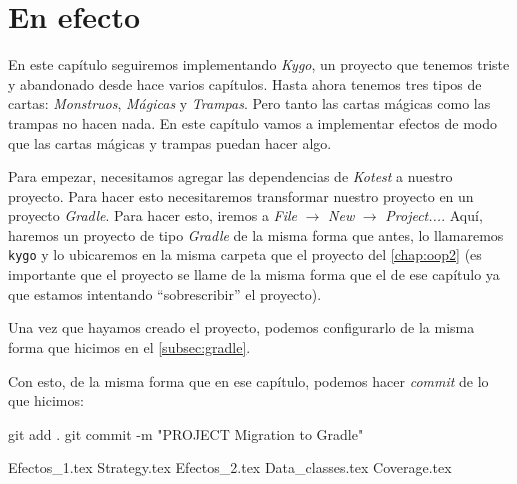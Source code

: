\chapter{En efecto}
\label{sec:strategy}
  
  En este capítulo seguiremos implementando \textit{Kygo}, un proyecto que tenemos triste y
  abandonado desde hace varios capítulos.
  Hasta ahora tenemos tres tipos de cartas: \textit{Monstruos}, \textit{Mágicas} y \textit{Trampas}.
  Pero tanto las cartas mágicas como las trampas no hacen nada.
  En este capítulo vamos a implementar efectos de modo que las cartas mágicas y trampas puedan
  hacer algo.

  Para empezar, necesitamos agregar las dependencias de \textit{Kotest} a nuestro proyecto.
  Para hacer esto necesitaremos transformar nuestro proyecto en un proyecto \textit{Gradle}.
  Para hacer esto, iremos a \textit{File} $\rightarrow$ \textit{New} $\rightarrow$ 
  \textit{Project...}.
  Aquí, haremos un proyecto de tipo \textit{Gradle} de la misma forma que antes, lo llamaremos
  \texttt{kygo} y lo ubicaremos en la misma carpeta que el proyecto del \cref{chap:oop2} (es 
  importante que el proyecto se llame de la misma forma que el de ese capítulo ya que estamos 
  intentando \enquote{sobrescribir} el proyecto).

  Una vez que hayamos creado el proyecto, podemos configurarlo de la misma forma que hicimos en el
  \cref{subsec:gradle}.

  Con esto, de la misma forma que en ese capítulo, podemos hacer \textit{commit} de lo que hicimos:

  \begin{powershell}
    git add .
    git commit -m "PROJECT Migration to Gradle"
  \end{powershell}

  {Efectos_1.tex}
  {Strategy.tex}
  {Efectos_2.tex}
  {Data_classes.tex}
  {Coverage.tex}

  \printbibliography[keyword=strategy]